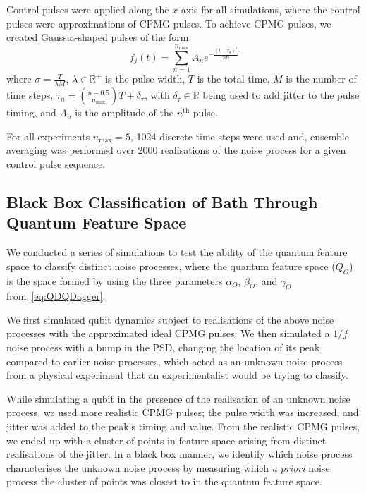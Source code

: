 \documentclass[12pt]{iopart}
\begin{document}
Control pulses were applied along the $x$-axis for all simulations, where the control pulses were approximations of CPMG pulses. To achieve CPMG pulses, we created Gaussia-shaped pulses of the form
\begin{equation} \label{eq:gaussian_pulse}
    f_{j}(t)=\sum_{n=1}^{n_{\max }} A_n e^{-\frac{\left(t-\tau_{n}\right)^{2}}{2 \sigma^{2}}}
\end{equation}
where $\sigma=\frac{T}{\lambda M}$, $\lambda \in \mathbb{R}^+$ is the pulse width, $T$ is the total time, $M$ is the number of time steps, $\tau_{n}=\left(\frac{n-0.5}{n_{\max }}\right) T+\delta_{\tau}$, with $\delta_{\tau} \in \mathbb{R}$ being used to add jitter to the pulse timing, and $A_n$ is the amplitude of the $n^{\mathrm{th}}$ pulse.

For all experiments $n_{\max}=5$, 1024 discrete time steps were used and, ensemble averaging was performed over 2000 realisations of the noise process for a given control pulse sequence.

\subsection{Black Box Classification of Bath Through Quantum Feature Space \label{subsec:black_box_noise_spectroscopy}}
We conducted a series of simulations to test the ability of the quantum feature space to classify distinct noise processes, where the quantum feature space ($Q_O$) is the space formed by using the three parameters $\alpha_O$, $\beta_O$, and $\gamma_O$ from~\cref{eq:QDQDagger}.

We first simulated qubit dynamics subject to realisations of the above noise processes with the approximated ideal CPMG pulses. We then simulated a $1/f$ noise process with a bump in the PSD, changing the location of its peak compared to earlier noise processes, which acted as an unknown noise process from a physical experiment that an experimentalist would be trying to classify.

While simulating a qubit in the presence of the realisation of an unknown noise process, we used more realistic CPMG pulses; the pulse width was increased, and jitter was added to the peak's timing and value. From the realistic CPMG pulses, we ended up with a cluster of points in feature space arising from distinct realisations of the jitter. In a black box manner, we identify which noise process characterises the unknown noise process by measuring which \textit{a priori} noise process the cluster of points was closest to in the quantum feature space.
\end{document}
